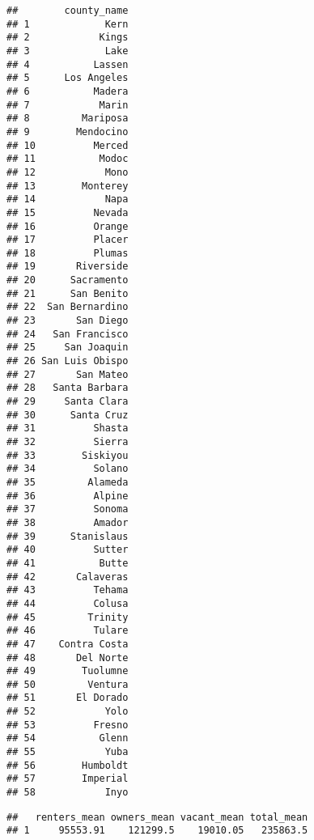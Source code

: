 \documentclass[
]{article}
\newenvironment{Shaded}{\begin{snugshade}}{\end{snugshade}}
\newcommand{\DataTypeTok}[1]{\textcolor[rgb]{0.13,0.29,0.53}{#1}}
\newcommand{\KeywordTok}[1]{\textcolor[rgb]{0.13,0.29,0.53}{\textbf{#1}}}
\newcommand{\NormalTok}[1]{#1}
\newcommand{\OperatorTok}[1]{\textcolor[rgb]{0.81,0.36,0.00}{\textbf{#1}}}
\newcommand{\StringTok}[1]{\textcolor[rgb]{0.31,0.60,0.02}{#1}}
\begin{document}
\begin{verbatim}
##        county_name
## 1             Kern
## 2            Kings
## 3             Lake
## 4           Lassen
## 5      Los Angeles
## 6           Madera
## 7            Marin
## 8         Mariposa
## 9        Mendocino
## 10          Merced
## 11           Modoc
## 12            Mono
## 13        Monterey
## 14            Napa
## 15          Nevada
## 16          Orange
## 17          Placer
## 18          Plumas
## 19       Riverside
## 20      Sacramento
## 21      San Benito
## 22  San Bernardino
## 23       San Diego
## 24   San Francisco
## 25     San Joaquin
## 26 San Luis Obispo
## 27       San Mateo
## 28   Santa Barbara
## 29     Santa Clara
## 30      Santa Cruz
## 31          Shasta
## 32          Sierra
## 33        Siskiyou
## 34          Solano
## 35         Alameda
## 36          Alpine
## 37          Sonoma
## 38          Amador
## 39      Stanislaus
## 40          Sutter
## 41           Butte
## 42       Calaveras
## 43          Tehama
## 44          Colusa
## 45         Trinity
## 46          Tulare
## 47    Contra Costa
## 48       Del Norte
## 49        Tuolumne
## 50         Ventura
## 51       El Dorado
## 52            Yolo
## 53          Fresno
## 54           Glenn
## 55            Yuba
## 56        Humboldt
## 57        Imperial
## 58            Inyo
\end{verbatim}

\begin{Shaded}
\end{Shaded}

\begin{verbatim}
##   renters_mean owners_mean vacant_mean total_mean
## 1     95553.91    121299.5    19010.05   235863.5
\end{verbatim}

\begin{Shaded}
\end{Shaded}
\end{document}
